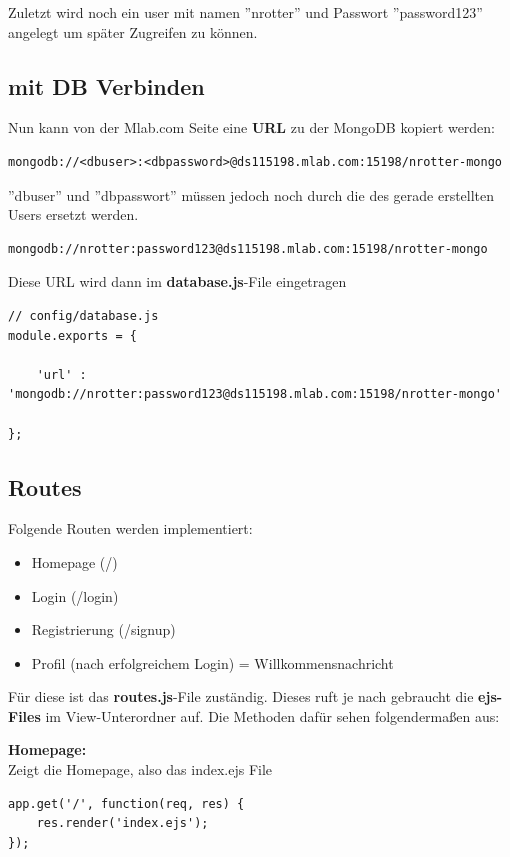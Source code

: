 Zuletzt wird noch ein user mit namen ''nrotter'' und Passwort ''password123'' angelegt um später Zugreifen zu können.

\subsection{mit DB Verbinden}
Nun kann von der Mlab.com Seite eine \textbf{URL} zu der MongoDB kopiert werden:
\begin{lstlisting}
mongodb://<dbuser>:<dbpassword>@ds115198.mlab.com:15198/nrotter-mongo
\end{lstlisting}

''dbuser'' und ''dbpasswort'' müssen jedoch noch durch die des gerade erstellten Users ersetzt werden.

\begin{lstlisting}
mongodb://nrotter:password123@ds115198.mlab.com:15198/nrotter-mongo
\end{lstlisting}

Diese URL wird dann im \textbf{database.js}-File eingetragen

\begin{lstlisting}
// config/database.js
module.exports = {
	
	'url' : 'mongodb://nrotter:password123@ds115198.mlab.com:15198/nrotter-mongo' 

};
\end{lstlisting}

\subsection{Routes}
Folgende Routen werden implementiert:
\begin{itemize}
	\item Homepage (/)
	\item Login (/login)
	\item Registrierung (/signup)
	\item Profil (nach erfolgreichem Login) = Willkommensnachricht
\end{itemize}

Für diese ist das \textbf{routes.js}-File zuständig. Dieses ruft je nach gebraucht die \textbf{ejs-Files} im View-Unterordner auf. Die Methoden dafür sehen folgendermaßen aus:

\textbf{Homepage:}\\

\leftskip=20pt
Zeigt die Homepage, also das index.ejs File
\begin{lstlisting}
app.get('/', function(req, res) {
	res.render('index.ejs'); 
});
\end{lstlisting}

